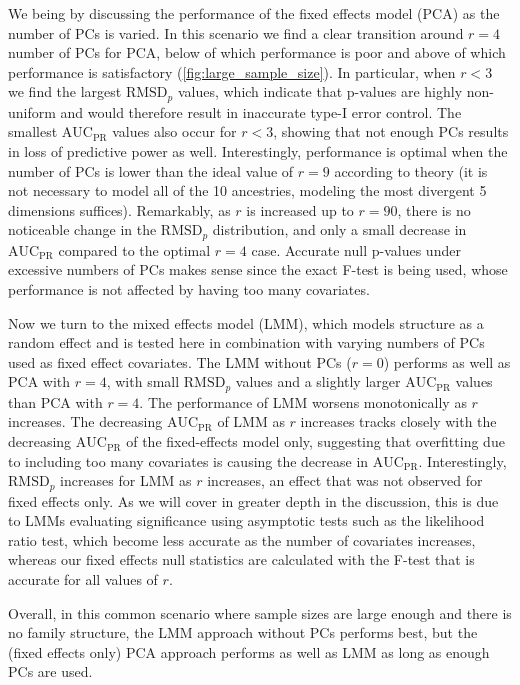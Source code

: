 \documentclass[11pt]{article}
\newcommand{\rmsd}{\text{RMSD}_p}
\newcommand{\auc}{\text{AUC}_\text{PR}}
\begin{document}
We being by discussing the performance of the fixed effects model (PCA) as the number of PCs is varied.
In this scenario we find a clear transition around $r = 4$ number of PCs for PCA, below of which performance is poor and above of which performance is satisfactory (\cref{fig:large_sample_size}).
In particular, when $r < 3$ we find the largest $\rmsd$ values, which indicate that p-values are highly non-uniform and would therefore result in inaccurate type-I error control.
The smallest $\auc$ values also occur for $r < 3$, showing that not enough PCs results in loss of predictive power as well.
Interestingly, performance is optimal when the number of PCs is lower than the ideal value of $r=9$ according to theory (it is not necessary to model all of the 10 ancestries, modeling the most divergent 5 dimensions suffices).
Remarkably, as $r$ is increased up to $r = 90$, there is no noticeable change in the $\rmsd$ distribution, and only a small decrease in $\auc$ compared to the optimal $r = 4$ case.
Accurate null p-values under excessive numbers of PCs makes sense since the exact F-test is being used, whose performance is not affected by having too many covariates.

Now we turn to the mixed effects model (LMM), which models structure as a random effect and is tested here in combination with varying numbers of PCs used as fixed effect covariates.
The LMM without PCs ($r=0$) performs as well as PCA with $r = 4$, with small $\rmsd$ values and a slightly larger $\auc$ values than PCA with $r = 4$.
The performance of LMM worsens monotonically as $r$ increases.
The decreasing $\auc$ of LMM as $r$ increases tracks closely with the decreasing $\auc$ of the fixed-effects model only, suggesting that overfitting due to including too many covariates is causing the decrease in $\auc$.
Interestingly, $\rmsd$ increases for LMM as $r$ increases, an effect that was not observed for fixed effects only.
As we will cover in greater depth in the discussion, this is due to LMMs evaluating significance using asymptotic tests such as the likelihood ratio test, which become less accurate as the number of covariates increases, whereas our fixed effects null statistics are calculated with the F-test that is accurate for all values of $r$.

Overall, in this common scenario where sample sizes are large enough and there is no family structure, the LMM approach without PCs performs best, but the (fixed effects only) PCA approach performs as well as LMM as long as enough PCs are used.
\end{document}

